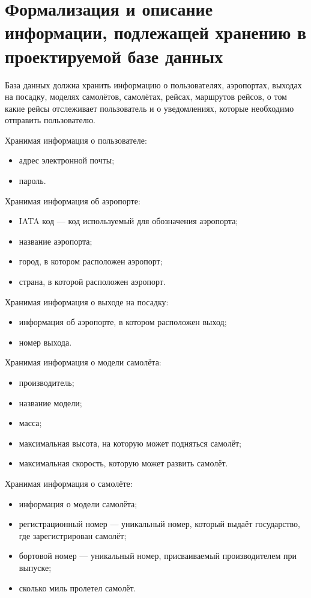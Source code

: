 \section{Формализация и описание информации, подлежащей хранению в проектируемой базе данных}
База данных должна хранить информацию о пользователях, аэропортах, выходах на посадку, моделях самолётов, самолётах, рейсах, маршрутов рейсов, о том какие рейсы отслеживает пользователь и о уведомлениях, которые необходимо отправить пользователю.

Хранимая информация о пользователе:
\begin{itemize}
	\item адрес электронной почты;
	\item пароль.
\end{itemize}

Хранимая информация об аэропорте:
\begin{itemize}
	\item IATA код --- код используемый для обозначения аэропорта;
	\item название аэропорта;
	\item город, в котором расположен аэропорт;
	\item страна, в которой расположен аэропорт.
\end{itemize}

Хранимая информация о выходе на посадку:
\begin{itemize}
	\item информация об аэропорте, в котором расположен выход;
	\item номер выхода.
\end{itemize}

Хранимая информация о модели самолёта:
\begin{itemize}
	\item производитель;
	\item название модели;
	\item масса;
	\item максимальная высота, на которую может подняться самолёт;
	\item максимальная скорость, которую может развить самолёт.
\end{itemize}

Хранимая информация о самолёте:
\begin{itemize}
	\item информация о модели самолёта;
	\item регистрационный номер --- уникальный номер, который выдаёт государство, где зарегистрирован самолёт;
	\item бортовой номер --- уникальный номер, присваиваемый производителем при выпуске;
	\item сколько миль пролетел самолёт.
\end{itemize}


